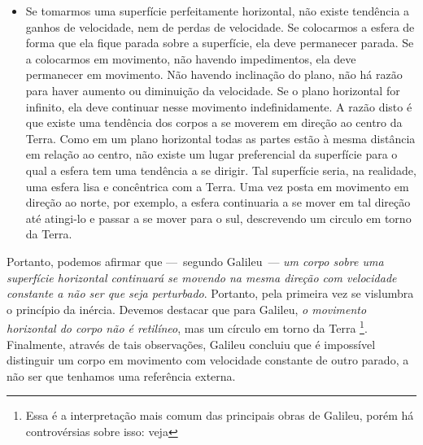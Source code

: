 \begin{itemize}
\begin{marginfigure}[15mm]
\centering
{}
\caption{Um a superfície horizontal infinita é, na verdade, uma esfera perfeitamente lisa.}
\end{marginfigure}
  \item Se tomarmos uma superfície perfeitamente horizontal, não existe tendência a ganhos de velocidade, nem de perdas de velocidade. Se colocarmos a esfera de forma que ela fique parada sobre a superfície, ela deve permanecer parada. Se a colocarmos em movimento, não havendo impedimentos, ela deve permanecer em movimento. Não havendo inclinação do plano, não há razão para haver aumento ou diminuição da velocidade. Se o plano horizontal for infinito, ela deve continuar nesse movimento indefinidamente. A razão disto é que existe uma tendência dos corpos a se moverem em direção ao centro da Terra. Como em um plano horizontal todas as partes estão à mesma distância em relação ao centro, não existe um lugar preferencial da superfície para o qual a esfera tem uma tendência a se dirigir. Tal superfície seria, na realidade, uma esfera lisa e concêntrica com a Terra. Uma vez posta em movimento em direção ao norte, por exemplo, a esfera continuaria a se mover em tal direção até atingi-lo e passar a se mover para o sul, descrevendo um circulo em torno da Terra.
\end{itemize}
%
Portanto, podemos afirmar que ---~segundo Galileu~--- \emph{um corpo sobre uma superfície horizontal continuará se movendo na mesma direção com velocidade constante a não ser que seja perturbado}. Portanto, pela primeira vez se vislumbra o princípio da inércia. Devemos destacar que para Galileu, \emph{o movimento horizontal do corpo não é retilíneo}, mas um círculo em torno da Terra \footnote{Essa é a interpretação mais comum das principais obras de Galileu, porém há controvérsias sobre isso: veja }. Finalmente, através de tais observações, Galileu concluiu que é impossível distinguir um corpo em movimento com velocidade constante de outro parado, a não ser que tenhamos uma referência externa.

